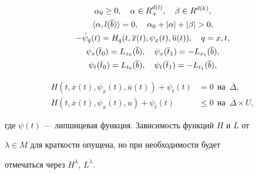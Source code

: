 \begin{gather}


\alpha_0 \geq 0,\quad \alpha\in R_+^{d(l)},\quad \beta\in


R^{d(k)},\notag \\


%


\langle\alpha, l(\overline {b})\rangle =0,\quad \alpha_0 +|\alpha


|+|\beta |>0,\notag \\


%


-\Dot{\psi}_q (t)=H_q


(t,\overline{x}(t),\psi_x (t), \overline{u}(t)),\quad q=x,t,


\label{8}\\


%


\psi_x (\overline{t}_0)=L_{x_0}(\overline{b}),\quad 


\psi_x (\overline{t}_1)=-L_{x_1}(\overline{b}),\notag \\


%


\psi_t (\overline{t}_0)=L_{t_0}(\overline{b}),\quad  \psi_t


(\overline{t}_1)=-L_{t_1}(\overline{b}), \notag


\end{gather}


\begin{equation}


\begin{split}


H(t,\overline{x}(t),\psi_x (t), \overline{u}(t))+\psi_t (t)&=0


\ \ \text{на}\ \; \overline{\Delta},\\


H(t,\overline{x}(t),\psi_x (t), u)+\psi_t (t)&\leq 0


\ \ \text{на}\ \; \overline{\Delta}\times U,


\end{split}


\label{9}


\end{equation}


где $\psi (t)$ --- липшицевая функция. Зависимость функций $H$ и $L$ от


$\lambda\in M$ для краткости опущена, но при необходимости будет


отмечаться через $H^{\lambda}$, $L^{\lambda}$.






